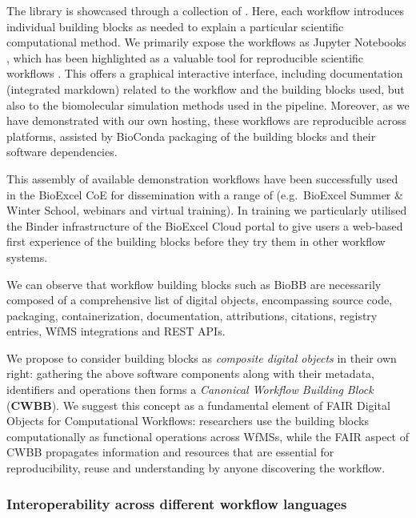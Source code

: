 The library is showcased through a collection of  \cite{Hospital 2020}.
Here, each workflow introduces individual building blocks as needed to explain a particular scientific computational method.
We primarily expose the workflows as Jupyter Notebooks \cite{Kluyver 2016}, which has been highlighted as a valuable tool for reproducible scientific workflows \cite{Beg 2021}.
This offers a graphical interactive interface, including documentation (integrated markdown) related to the workflow and the building blocks used, but also to the biomolecular simulation methods used in the pipeline.
Moreover, as we have demonstrated with our own  \cite{Jupyter 2018} hosting, these workflows are reproducible across platforms, assisted by BioConda \cite{Grüning 2018a} packaging of the building blocks and their software dependencies.

This assembly of available demonstration workflows have been successfully used in the BioExcel CoE for dissemination with a range of  
(e.g.~BioExcel Summer \& Winter School, webinars and virtual training).
In training we particularly utilised the Binder infrastructure of the BioExcel Cloud portal \cite{Niewielska 2020} to give users a web-based first experience of the building blocks before they try them in other workflow systems.

We can observe that workflow building blocks such as BioBB are necessarily composed of a comprehensive list of digital objects, encompassing source code, packaging, containerization, documentation, attributions, citations, registry entries, WfMS integrations and \acrshort{REST} \acrshort{API}s.

We propose to consider building blocks as \emph{composite digital objects} in their own right: gathering the above software components along with their metadata, identifiers and operations then forms a \emph{Canonical Workflow Building Block} (\textbf{CWBB}).
We suggest this concept as a fundamental element of FAIR Digital Objects for Computational Workflows: researchers use the building blocks computationally as functional operations across WfMSs, while the FAIR aspect of CWBB propagates information and resources that are essential for reproducibility, reuse and understanding by anyone discovering the workflow.

\subsubsection{Interoperability across different workflow languages}\label{ch6:interoperability-across-different-workflow-languages}

